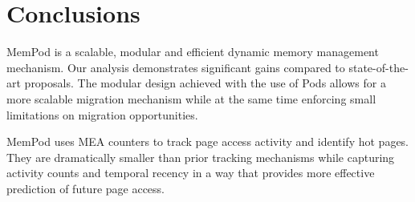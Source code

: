 \section{Conclusions}
\label{sec:Conclusions}

MemPod is a scalable, modular and efficient dynamic memory management mechanism. Our analysis demonstrates significant gains compared to state-of-the-art proposals. The modular design achieved with the use of Pods allows for a more scalable migration mechanism while at the same time enforcing small limitations on migration opportunities.

MemPod uses MEA counters to track page access activity and identify hot
pages.  They are dramatically smaller than prior tracking mechanisms
while capturing activity counts and temporal recency in a way that
provides more effective prediction of future page access.



